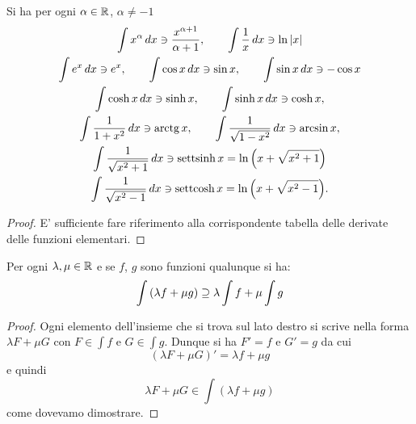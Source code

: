 \begin{theorem}
Si ha
per ogni $\alpha \in \mathbb R$, $\alpha\neq -1$
\begin{gather*}
\int x^\alpha\, dx \ni \frac{x^{\alpha+1}}{\alpha+1},
\qquad
\int \frac{1}{x}\, dx \ni \ln{\left|x\right|}
\\
\int e^x \, dx \ni e^x,
\qquad
\int \cos x\, dx \ni \sin x,
\qquad
\int \sin x\, dx \ni -\cos x
\\
\int \cosh x \, dx \ni \sinh x,\qquad
\int \sinh x \, dx \ni \cosh x, \\
\int \frac{1}{1+x^2}\, dx \ni \operatorname{arctg} x, \qquad
\int \frac{1}{\sqrt{1-x^2}}\, dx \ni \arcsin x, \\
\int \frac{1}{\sqrt{x^2+1}}\, dx \ni \operatorname{settsinh} x = \ln{\left( x+\sqrt{x^2+1} \right)}\\
\int \frac{1}{\sqrt{x^2-1}}\, dx \ni \operatorname{settcosh} x = \ln{\left( x+\sqrt{x^2-1} \right)}.
\end{gather*}
\end{theorem}
%
\begin{proof}
E' sufficiente fare riferimento alla corrispondente tabella
delle derivate delle funzioni elementari.
\end{proof}

\begin{theorem}
Per ogni $\lambda,\mu \in \mathbb R$ e se $f$, $g$ sono funzioni qualunque si ha:
\[
  \int {\left( \lambda f + \mu g \right)} \supseteq \lambda \int f + \mu \int g
\]
\end{theorem}
%
\begin{proof}
Ogni elemento dell'insieme che si trova sul lato destro
si scrive nella forma $\lambda F + \mu G$ con $F\in \int f$ e $G\in \int g$.
Dunque si ha $F'=f$ e $G'=g$ da cui
\[
  (\lambda F + \mu G)' = \lambda f + \mu g
\]
e quindi
\[
  \lambda F + \mu G \in \int (\lambda f + \mu g)
\]
come dovevamo dimostrare.
\end{proof}

